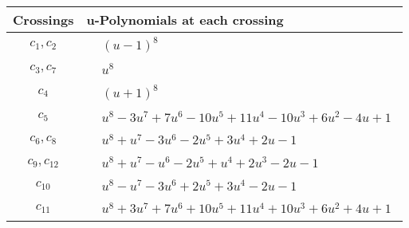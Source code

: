 \documentclass[1p]{elsarticle_modified}
\theoremstyle{definition}
\begin{document}
\begin{tabular}{m{50pt}|m{274pt}}
Crossings & \hspace{64pt}u-Polynomials at each crossing \\
\hline $$\begin{aligned}c_{1},c_{2}\end{aligned}$$&$\begin{aligned}
&(u-1)^8
\end{aligned}$\\
\hline $$\begin{aligned}c_{3},c_{7}\end{aligned}$$&$\begin{aligned}
&u^8
\end{aligned}$\\
\hline $$\begin{aligned}c_{4}\end{aligned}$$&$\begin{aligned}
&(u+1)^8
\end{aligned}$\\
\hline $$\begin{aligned}c_{5}\end{aligned}$$&$\begin{aligned}
&u^8-3 u^7+7 u^6-10 u^5+11 u^4-10 u^3+6 u^2-4 u+1
\end{aligned}$\\
\hline $$\begin{aligned}c_{6},c_{8}\end{aligned}$$&$\begin{aligned}
&u^8+u^7-3 u^6-2 u^5+3 u^4+2 u-1
\end{aligned}$\\
\hline $$\begin{aligned}c_{9},c_{12}\end{aligned}$$&$\begin{aligned}
&u^8+u^7- u^6-2 u^5+u^4+2 u^3-2 u-1
\end{aligned}$\\
\hline $$\begin{aligned}c_{10}\end{aligned}$$&$\begin{aligned}
&u^8- u^7-3 u^6+2 u^5+3 u^4-2 u-1
\end{aligned}$\\
\hline $$\begin{aligned}c_{11}\end{aligned}$$&$\begin{aligned}
&u^8+3 u^7+7 u^6+10 u^5+11 u^4+10 u^3+6 u^2+4 u+1
\end{aligned}$\\
\hline
\end{tabular}\\~\\
\end{document}
